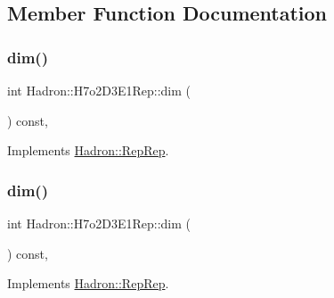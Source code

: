 \subsection{Member Function Documentation}
\mbox{\label{structHadron_1_1H7o2D3E1Rep_a1dd01ae39e29a77dc0082769e31af9cf}} 
\subsubsection{\texorpdfstring{dim()}{dim()}\hspace{0.1cm}{\footnotesize\ttfamily [1/5]}}
{\footnotesize\ttfamily int Hadron\+::\+H7o2\+D3\+E1\+Rep\+::dim (\begin{DoxyParamCaption}{ }\end{DoxyParamCaption}) const\hspace{0.3cm}{\ttfamily [inline]}, {\ttfamily [virtual]}}



Implements \mbox{\hyperlink{structHadron_1_1RepRep_a92c8802e5ed7afd7da43ccfd5b7cd92b}{Hadron\+::\+Rep\+Rep}}.

\mbox{\label{structHadron_1_1H7o2D3E1Rep_a1dd01ae39e29a77dc0082769e31af9cf}} 
\subsubsection{\texorpdfstring{dim()}{dim()}\hspace{0.1cm}{\footnotesize\ttfamily [2/5]}}
{\footnotesize\ttfamily int Hadron\+::\+H7o2\+D3\+E1\+Rep\+::dim (\begin{DoxyParamCaption}{ }\end{DoxyParamCaption}) const\hspace{0.3cm}{\ttfamily [inline]}, {\ttfamily [virtual]}}



Implements \mbox{\hyperlink{structHadron_1_1RepRep_a92c8802e5ed7afd7da43ccfd5b7cd92b}{Hadron\+::\+Rep\+Rep}}.

\mbox{\label{structHadron_1_1H7o2D3E1Rep_a1dd01ae39e29a77dc0082769e31af9cf}} 
